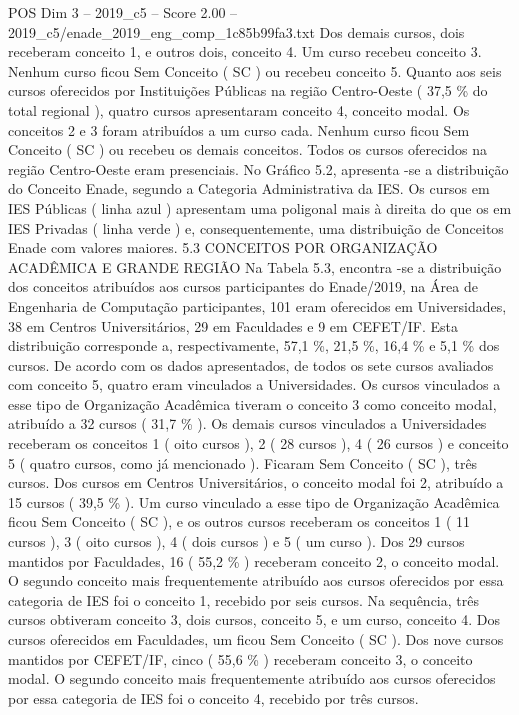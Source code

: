 \begin{textsample}{POS Dim 3 – 2019\_c5 – Score 2.00 – 2019\_c5/enade\_2019\_eng\_comp\_1c85b99fa3.txt}
Dos demais cursos, dois receberam conceito 1, e outros dois, conceito 4.
Um curso recebeu conceito 3.
Nenhum curso ficou Sem Conceito ( SC ) ou recebeu conceito 5.
Quanto aos seis cursos oferecidos por Instituições Públicas na região Centro-Oeste ( 37,5 \% do total regional ), quatro cursos apresentaram conceito 4, conceito modal.
Os conceitos 2 e 3 foram atribuídos a um curso cada.
Nenhum curso ficou Sem Conceito ( SC ) ou recebeu os demais conceitos.
Todos os cursos oferecidos na região Centro-Oeste eram presenciais.
No Gráfico 5.2, apresenta -se a distribuição do Conceito Enade, segundo a Categoria Administrativa da IES.
Os cursos em IES Públicas ( linha azul ) apresentam uma poligonal mais à direita do que os em IES Privadas ( linha verde ) e, consequentemente, uma distribuição de Conceitos Enade com valores maiores. 5.3 CONCEITOS POR ORGANIZAÇÃO ACADÊMICA E GRANDE REGIÃO Na Tabela 5.3, encontra -se a distribuição dos conceitos atribuídos aos cursos participantes do Enade/2019, na Área de Engenharia de Computação participantes, 101 eram oferecidos em Universidades, 38 em Centros Universitários, 29 em Faculdades e 9 em CEFET/IF.
Esta distribuição corresponde a, respectivamente, 57,1 \%, 21,5 \%, 16,4 \% e 5,1 \% dos cursos.
De acordo com os dados apresentados, de todos os sete cursos avaliados com conceito 5, quatro eram vinculados a Universidades.
Os cursos vinculados a esse tipo de Organização Acadêmica tiveram o conceito 3 como conceito modal, atribuído a 32 cursos ( 31,7 \% ).
Os demais cursos vinculados a Universidades receberam os conceitos 1 ( oito cursos ), 2 ( 28 cursos ), 4 ( 26 cursos ) e conceito 5 ( quatro cursos, como já mencionado ).
Ficaram Sem Conceito ( SC ), três cursos.
Dos cursos em Centros Universitários, o conceito modal foi 2, atribuído a 15 cursos ( 39,5 \% ).
Um curso vinculado a esse tipo de Organização Acadêmica ficou Sem Conceito ( SC ), e os outros cursos receberam os conceitos 1 ( 11 cursos ), 3 ( oito cursos ), 4 ( dois cursos ) e 5 ( um curso ).
Dos 29 cursos mantidos por Faculdades, 16 ( 55,2 \% ) receberam conceito 2, o conceito modal.
O segundo conceito mais frequentemente atribuído aos cursos oferecidos por essa categoria de IES foi o conceito 1, recebido por seis cursos.
Na sequência, três cursos obtiveram conceito 3, dois cursos, conceito 5, e um curso, conceito 4.
Dos cursos oferecidos em Faculdades, um ficou Sem Conceito ( SC ).
Dos nove cursos mantidos por CEFET/IF, cinco ( 55,6 \% ) receberam conceito 3, o conceito modal.
O segundo conceito mais frequentemente atribuído aos cursos oferecidos por essa categoria de IES foi o conceito 4, recebido por três cursos.

\end{textsample}
